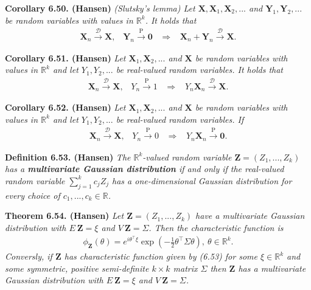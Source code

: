 \documentclass[a4paper,12pt,openany]{book}
\begin{document}
\textbf{Corollary 6.50. (Hansen)} \emph{(Slutsky's lemma) Let \(\mathbf{X},\mathbf{X}_1,\mathbf{X}_2,...\) and \(\mathbf{Y}_1,\mathbf{Y}_2,...\) be random variables with values in \(\mathbb{R}^k\). It holds that}
\begin{align*}
    \mathbf{X}_n\stackrel{\mathcal{D}}{\to} \mathbf{X},\hspace{10pt}\mathbf{Y}_n\stackrel{\text{P}}{\to} \mathbf{0}\hspace{10pt}\Rightarrow\hspace{10pt} \mathbf{X}_n+\mathbf{Y}_n\stackrel{\mathcal{D}}{\to}\mathbf{X}.
\end{align*}

\textbf{Corollary 6.51. (Hansen)} \emph{Let \(\mathbf{X}_1,\mathbf{X}_2,...\) and \(\mathbf{X}\) be random variables with values in \(\mathbb{R}^k\) and let \(Y_1,Y_2,...\) be real-valued random variables. It holds that}
\begin{align*}
    \mathbf{X}_n\stackrel{\mathcal{D}}{\to} \mathbf{X},\hspace{10pt}Y_n\stackrel{\text{P}}{\to} 1\hspace{10pt}\Rightarrow\hspace{10pt} Y_n\mathbf{X}_n\stackrel{\mathcal{D}}{\to}\mathbf{X}.
\end{align*}

\textbf{Corollary 6.52. (Hansen)} \emph{Let \(\mathbf{X}_1,\mathbf{X}_2,...\) and \(\mathbf{X}\) be random variables with values in \(\mathbb{R}^k\) and let \(Y_1,Y_2,...\) be real-valued random variables. If}
\begin{align*}
    \mathbf{X}_n\stackrel{\mathcal{D}}{\to} \mathbf{X},\hspace{10pt}Y_n\stackrel{\text{P}}{\to} 0\hspace{10pt}\Rightarrow\hspace{10pt} Y_n\mathbf{X}_n\stackrel{\text{P}}{\to} \mathbf{0}.
\end{align*}

\textbf{Definition 6.53. (Hansen)} \emph{The \(\mathbb{R}^k\)-valued random variable \(\mathbf{Z}=(Z_1,...,Z_k)\) has a \textbf{multivariate Gaussian distribution} if and only if the real-valued random variable \(\sum_{j=1}^kc_jZ_j\) has a one-dimensional Gaussian distribution for every choice of \(c_1,...,c_k\in\mathbb{R}\).}

\textbf{Theorem 6.54. (Hansen)} \emph{Let \(\mathbf{Z}=(Z_1,...,Z_k)\) have a multivariate Gaussian distribution with \(E\ \mathbf{Z}=\xi\) and \(V\ \mathbf{Z}=\Sigma\). Then the characteristic function is}
\begin{align*}
    \phi_\mathbf{Z}(\theta)=e^{i\theta^\top\xi}\exp\left(-\frac{1}{2}\theta^\top\Sigma\theta\right),\ \theta\in\mathbb{R}^k.\tag{6.53}
\end{align*}
\emph{Conversly, if \(\mathbf{Z}\) has characteristic function given by (6.53) for some \(\xi\in\mathbb{R}^k\) and some symmetric, positive semi-definite \(k\times k\) matrix \(\Sigma\) then \(\mathbf{Z}\) has a multivariate Gaussian distribution with \(E\ \mathbf{Z}=\xi\) and \(V\ \mathbf{Z}=\Sigma\).}
\end{document}
